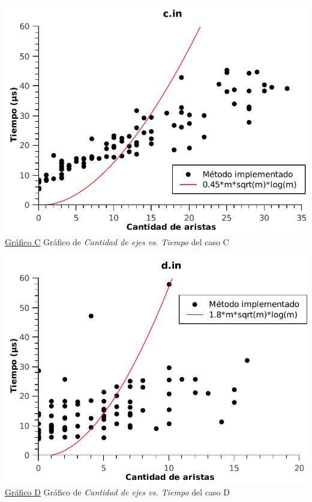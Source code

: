 \begin{center}
\vspace*{1.5cm}
\hspace*{-2.1cm}\includegraphics[scale = 0.9]{../ej2/pruebas_graficos/GraphC.pdf} \\
\underline{Gráfico C} Gráfico de \textit{Cantidad de ejes vs. Tiempo} del caso C

\vspace*{1.5cm}
\hspace*{-2.1cm}\includegraphics[scale = 0.9]{../ej2/pruebas_graficos/GraphD.pdf} \\
\underline{Gráfico D} Gráfico de \textit{Cantidad de ejes vs. Tiempo} del caso D


\end{center}
